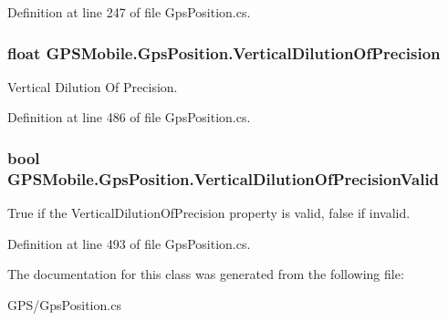 Definition at line 247 of file GpsPosition.cs.\hypertarget{class_g_p_s_mobile_1_1_gps_position_a5ec365b867e36ff34e3f4f9018f729a3}{
\subsubsection[{VerticalDilutionOfPrecision}]{\setlength{\rightskip}{0pt plus 5cm}float GPSMobile.GpsPosition.VerticalDilutionOfPrecision}}
\label{class_g_p_s_mobile_1_1_gps_position_a5ec365b867e36ff34e3f4f9018f729a3}


Vertical Dilution Of Precision. 

Definition at line 486 of file GpsPosition.cs.\hypertarget{class_g_p_s_mobile_1_1_gps_position_a78a856cdd3a6a5438ba96e95f52bf2b8}{
\subsubsection[{VerticalDilutionOfPrecisionValid}]{\setlength{\rightskip}{0pt plus 5cm}bool GPSMobile.GpsPosition.VerticalDilutionOfPrecisionValid}}
\label{class_g_p_s_mobile_1_1_gps_position_a78a856cdd3a6a5438ba96e95f52bf2b8}


True if the VerticalDilutionOfPrecision property is valid, false if invalid. 

Definition at line 493 of file GpsPosition.cs.

The documentation for this class was generated from the following file:\begin{DoxyCompactItemize}
\item 
GPS/GpsPosition.cs\end{DoxyCompactItemize}
